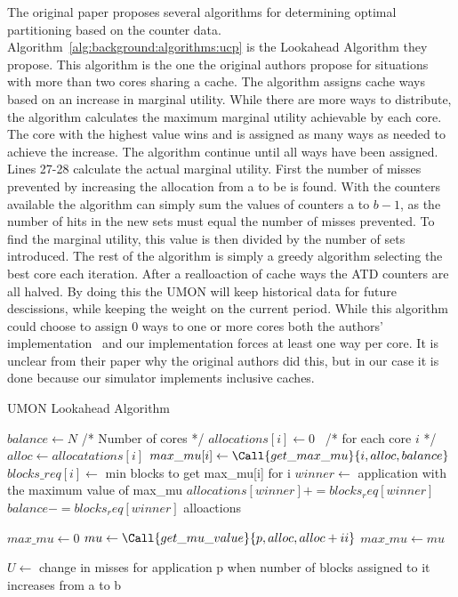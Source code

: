 The original paper proposes several algorithms for determining optimal partitioning based on the counter data. 
Algorithm~\ref{alg:background:algorithms:ucp} is the Lookahead Algorithm they propose.
This algorithm is the one the original authors propose for situations with more than two cores sharing a cache.
The algorithm assigns cache ways based on an increase in marginal utility.
While there are more ways to distribute, the algorithm calculates the maximum marginal utility achievable by each core. 
The core with the highest value wins and is assigned as many ways as needed to achieve the increase.
The algorithm continue until all ways have been assigned.
Lines 27-28 calculate the actual marginal utility. 
First the number of misses prevented by increasing the allocation from a to be is found.
With the counters available the algorithm can simply sum the values of counters a to $b-1$, as the number of hits in the new sets must equal the number of misses prevented.
To find the marginal utility, this value is then divided by the number of sets introduced.
The rest of the algorithm is simply a greedy algorithm selecting the best core each iteration.
After a realloaction of cache ways the ATD counters are all halved.
By doing this the UMON will keep historical data for future descissions, while keeping the weight on the current period.
While this algorithm could choose to assign 0 ways to one or more cores both the authors' implementation~\cite{Qureshi2006} and our implementation forces at least one way per core.
It is unclear from their paper why the original authors did this, but in our case it is done because our simulator implements inclusive caches.

\begin{algorithm}[ht]
\caption{UMON Lookahead Algorithm}
\label{alg:background:algorithms:ucp}
\begin{algorithmic}[1]
\State $balance\gets N$ /* Number of cores */
\State $allocations[i]\gets 0$  /* for each core $i$ */
        \State $alloc\gets allocatations[i]$
        \State $max\_mu[i]\gets \Call{get\_max\_mu}{i, alloc, balance}$
        \State $blocks\_req[i]\gets$ min blocks to get max\_mu[i] for i
    \EndFor
    \State $winner\gets$ application with the maximum value of max\_mu
    \State $allocations[winner] += blocks_req[winner]$
    \State $balance -= blocks_req[winner]$
\EndWhile
\State \Return alloactions
\State

    \State $max\_mu\gets 0$
        \State $mu\gets \Call{get\_mu\_value}{p, alloc, alloc+ii}$
            \State $max\_mu\gets mu$
        \EndIf
    \EndFor
    \State {}
\EndFunction
\State

    \State $U\gets$ change in misses for application p when number of blocks assigned to it increases from a to b
    \State {}
\EndFunction
\end{algorithmic}
\end{algorithm}

